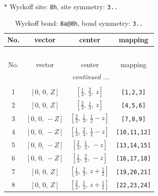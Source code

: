\documentclass[fleqn,8pt]{jsarticle}
\begin{document}
* Wyckoff site: {\tt 8h}, site symmetry: {\tt 3..}
\renewcommand{\arraystretch}{1.2}
\begin{longtable}{cccc}
\caption{Wyckoff bond: {\tt 8a@8h}, bond symmetry: {\tt 3..}}
 \\
 \hline \hline
No. & vector & center & mapping \\ \hline \endfirsthead

\multicolumn{3}{l}{\tablename\ \thetable{}} \\
 \hline \hline
No. & vector & center & mapping \\ \hline \endhead

 \hline \hline
\multicolumn{3}{r}{\footnotesize\it continued ...} \\ \endfoot

 \hline \hline
\multicolumn{3}{r}{} \\ \endlastfoot

1 & $\left[ 0,\, 0,\, Z \right]$ & $\left[ \frac{1}{3},\, \frac{2}{3},\, z \right]$ & {\tt [1,2,3]} \\ \hline
2 & $\left[ 0,\, 0,\, Z \right]$ & $\left[ \frac{2}{3},\, \frac{1}{3},\, z \right]$ & {\tt [4,5,6]} \\ \hline
3 & $\left[ 0,\, 0,\, - Z \right]$ & $\left[ \frac{2}{3},\, \frac{1}{3},\, \frac{1}{2} - z \right]$ & {\tt [7,8,9]} \\ \hline
4 & $\left[ 0,\, 0,\, - Z \right]$ & $\left[ \frac{1}{3},\, \frac{2}{3},\, \frac{1}{2} - z \right]$ & {\tt [10,11,12]} \\ \hline
5 & $\left[ 0,\, 0,\, - Z \right]$ & $\left[ \frac{2}{3},\, \frac{1}{3},\, - z \right]$ & {\tt [13,14,15]} \\ \hline
6 & $\left[ 0,\, 0,\, - Z \right]$ & $\left[ \frac{1}{3},\, \frac{2}{3},\, - z \right]$ & {\tt [16,17,18]} \\ \hline
7 & $\left[ 0,\, 0,\, Z \right]$ & $\left[ \frac{1}{3},\, \frac{2}{3},\, z + \frac{1}{2} \right]$ & {\tt [19,20,21]} \\ \hline
8 & $\left[ 0,\, 0,\, Z \right]$ & $\left[ \frac{2}{3},\, \frac{1}{3},\, z + \frac{1}{2} \right]$ & {\tt [22,23,24]} \\
\end{longtable}
\renewcommand{\arraystretch}{1.2}
\end{document}
